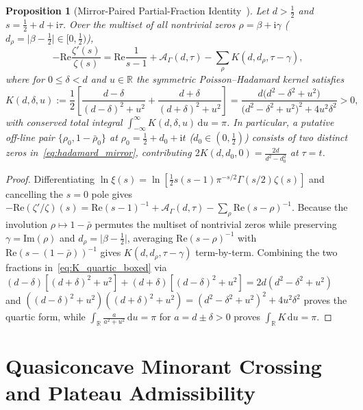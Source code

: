 \documentclass[11pt,reqno]{amsart}
\newtheorem{proposition}[theorem]{Proposition}
\theoremstyle{definition}
\theoremstyle{remark}
\numberwithin{equation}{section}
\newcommand{\R}{\mathbb{R}}
\newcommand{\dd}{\mathrm{d}}
\newcommand{\ii}{\mathrm{i}}
\newcommand{\Rea}{\mathrm{Re}}
\newcommand{\Ima}{\mathrm{Im}}
\begin{document}
\begin{proposition}[Mirror-Paired Partial-Fraction Identity~\cite{stechkin1970}]\label{prop:stechkin_kernel}
Let $d > \frac{1}{2}$ and $s = \frac{1}{2} + d + \ii\tau$. Over the multiset of all nontrivial zeros $\rho = \beta + \ii\gamma$ ($d_\rho = \lvert\beta - \frac{1}{2}\rvert \in [0, \frac{1}{2})$),
\begin{equation}\label{eq:hadamard_mirror}
-\Rea\frac{\zeta'(s)}{\zeta(s)} = \Rea\frac{1}{s - 1} + \mathcal{A}_\Gamma(d, \tau) - \sum_{\rho} K(d, d_\rho, \tau - \gamma),
\end{equation}
where for $0 \le \delta < d$ and $u \in \R$ the symmetric Poisson--Hadamard kernel satisfies
\begin{equation}\label{eq:K_quartic_boxed}
\boxed{K(d, \delta, u) := \frac{1}{2}\left[\frac{d - \delta}{(d - \delta)^2 + u^2} + \frac{d + \delta}{(d + \delta)^2 + u^2}\right] = \frac{d\bigl(d^2 - \delta^2 + u^2\bigr)}{\bigl(d^2 - \delta^2 + u^2\bigr)^2 + 4u^2\delta^2} > 0,}
\end{equation}
with conserved total integral $\int_{-\infty}^{\infty} K(d, \delta, u)\,\dd u = \pi$. In particular, a putative off-line pair $\{\rho_0, 1 - \bar{\rho}_0\}$ at $\rho_0 = \frac{1}{2} + d_0 + \ii t$ ($d_0 \in (0, \frac{1}{2})$) consists of two distinct zeros in~\eqref{eq:hadamard_mirror}, contributing $2K(d, d_0, 0) = \frac{2d}{d^2 - d_0^2}$ at $\tau = t$.
\end{proposition}

\begin{proof}
Differentiating $\ln\xi(s) = \ln[\frac{1}{2}s(s-1)\pi^{-s/2}\Gamma(s/2)\zeta(s)]$ and cancelling the $s = 0$ pole gives $-\Rea(\zeta'/\zeta)(s) = \Rea(s-1)^{-1} + \mathcal{A}_\Gamma(d,\tau) - \sum_\rho \Rea(s-\rho)^{-1}$. Because the involution $\rho \mapsto 1 - \bar{\rho}$ permutes the multiset of nontrivial zeros while preserving $\gamma = \Ima(\rho)$ and $d_\rho = \lvert\beta - \frac{1}{2}\rvert$, averaging $\Rea(s - \rho)^{-1}$ with $\Rea(s - (1 - \bar{\rho}))^{-1}$ gives $K(d, d_\rho, \tau - \gamma)$ term-by-term. Combining the two fractions in~\eqref{eq:K_quartic_boxed} via $(d - \delta)[(d + \delta)^2 + u^2] + (d + \delta)[(d - \delta)^2 + u^2] = 2d(d^2 - \delta^2 + u^2)$ and $((d-\delta)^2+u^2)((d+\delta)^2+u^2) = (d^2-\delta^2+u^2)^2 + 4u^2\delta^2$ proves the quartic form, while $\int_{\R} \frac{a}{a^2+u^2}\,\dd u = \pi$ for $a = d \pm \delta > 0$ proves $\int_{\R} K\,\dd u = \pi$.
\end{proof}

\section{Quasiconcave Minorant Crossing and Plateau Admissibility}\label{sec:crossing}
\end{document}
